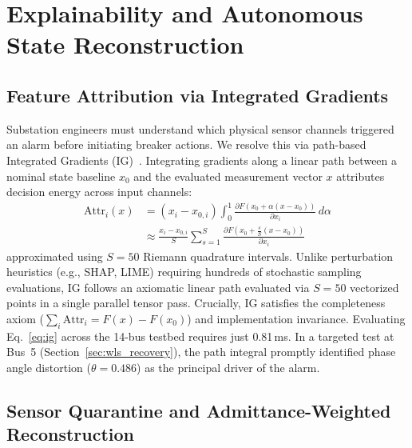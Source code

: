 \documentclass[runningheads]{llncs}
\begin{document}
\section{Explainability and Autonomous State Reconstruction}
\label{sec:xai_healing}

\subsection{Feature Attribution via Integrated Gradients}

Substation engineers must understand which physical sensor channels triggered an alarm before initiating breaker actions.
We resolve this via path-based Integrated Gradients (IG)~\cite{sundararajan2017axiomatic}.
Integrating gradients along a linear path between a nominal state baseline $x_0$ and the evaluated measurement vector $x$ attributes decision energy across input channels:
\begin{equation}
\begin{aligned}
\mathrm{Attr}_{i}(x) &= (x_{i} - x_{0,i}) \int_{0}^{1} \frac{\partial F(x_{0} + \alpha(x - x_{0}))}{\partial x_{i}}\, d\alpha \\
&\approx \frac{x_{i} - x_{0,i}}{S} \sum_{s=1}^{S} \frac{\partial F\!\left(x_{0} + \frac{s}{S}(x - x_{0})\right)}{\partial x_{i}}
\end{aligned}
\label{eq:ig}
\end{equation}
approximated using $S = 50$ Riemann quadrature intervals.
Unlike perturbation heuristics (e.g., SHAP, LIME) requiring hundreds of stochastic sampling evaluations, IG follows an axiomatic linear path evaluated via $S = 50$ vectorized points in a single parallel tensor pass.
Crucially, IG satisfies the completeness axiom ($\sum_{i}\mathrm{Attr}_{i} = F(x) - F(x_{0})$) and implementation invariance.
Evaluating Eq.~\eqref{eq:ig} across the 14-bus testbed requires just 0.81\,ms.
In a targeted test at Bus~5 (Section~\ref{sec:wls_recovery}), the path integral promptly identified phase angle distortion ($\theta = 0.486$) as the principal driver of the alarm.

\subsection{Sensor Quarantine and Admittance-Weighted Reconstruction}
\end{document}
